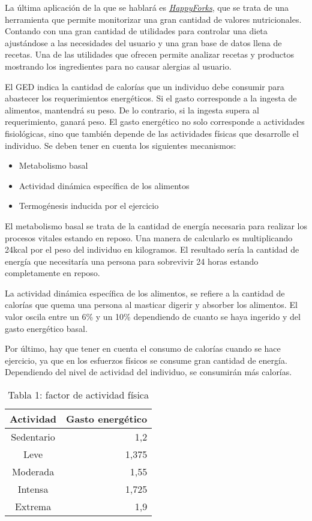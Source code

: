 La última aplicación de la que se hablará es \href{https://happyforks.com/}{\emph{HappyForks}}, que se trata de una herramienta que permite monitorizar una gran cantidad de valores nutricionales. Contando con una gran cantidad de utilidades para controlar una dieta ajustándose a las necesidades del usuario y una gran base de datos llena de recetas. Una de las utilidades que ofrecen permite analizar recetas y productos mostrando los ingredientes para no causar alergias al usuario. 

El GED indica la cantidad de calorías que un individuo debe consumir para abastecer los requerimientos energéticos. Si el gasto corresponde a la ingesta de alimentos, mantendrá su peso. De lo contrario, si la ingesta supera al requerimiento, ganará peso. El gasto energético no solo corresponde a actividades fisiológicas, sino que también depende de las actividades físicas que desarrolle el individuo. Se deben tener en cuenta los siguientes mecanismos: 
\begin{itemize}
    \item Metabolismo basal
    \item Actividad dinámica específica de los alimentos
    \item Termogénesis inducida por el ejercicio
\end{itemize}

El metabolismo basal se trata de la cantidad de energía necesaria para realizar los procesos vitales estando en reposo. Una manera de calcularlo es multiplicando 24kcal por el peso del individuo en kilogramos. El resultado sería la cantidad de energía que necesitaría una persona para sobrevivir 24 horas estando completamente en reposo. 

La actividad dinámica específica de los alimentos, se refiere a la cantidad de calorías que quema una persona al masticar digerir y absorber los alimentos. El valor oscila entre un 6\% y un 10\% dependiendo de cuanto se haya ingerido y del gasto energético basal.

Por último, hay que tener en cuenta el consumo de calorías cuando se hace ejercicio, ya que en los esfuerzos físicos se consume gran cantidad de energía. Dependiendo del nivel de actividad del individuo, se consumirán más calorías. 
\begin{table}[h]
    \begin{center}
        \begin{tabular}{| c | r |}
            Actividad & Gasto energético \\ \hline
            Sedentario & 1,2 \\
            Leve & 1,375 \\
            Moderada & 1,55 \\
            Intensa & 1,725 \\
            Extrema & 1,9 \\ \hline
        \end{tabular}
        \caption{Tabla 1: factor de actividad física}
        \label{tab:FAF}
    \end{center}
\end{table}

